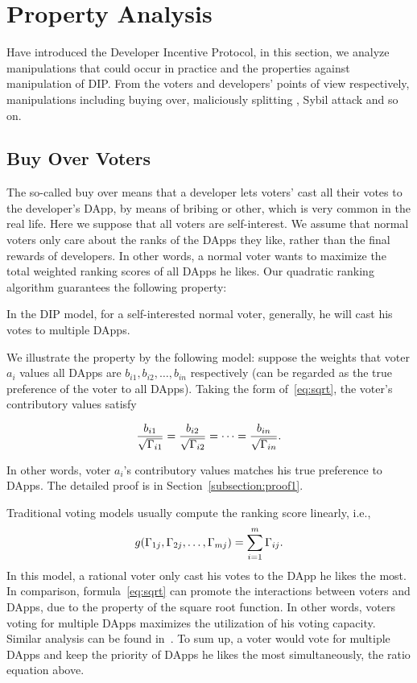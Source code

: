 \section{Property Analysis}
\label{section:properties}
\noindent Have introduced the Developer Incentive Protocol, in this section, we analyze
manipulations that could occur in practice and the properties against
manipulation of  DIP\@. From the voters and developers' points of view respectively, manipulations including buying over, maliciously splitting \dapp, Sybil attack and so on.
\subsection{Buy Over Voters}
\noindent The so-called buy over means that a developer lets voters' cast all their votes to the developer's DApp, by means of bribing or other, which is very common in the real life. Here we suppose that all voters are self-interest. We assume that normal voters only care about the ranks of the DApps they like, rather than the final rewards of developers. In other words, a normal voter wants to maximize the total
weighted ranking scores of all DApps he likes. Our quadratic ranking algorithm guarantees the following property:

\begin{property}
	\label{p1}
	In the DIP model, for a self-interested normal voter, generally, he will cast his votes to multiple DApps.
\end{property}
We illustrate the property by the following model: suppose the weights that
voter $a_i$ values all DApps are $b_{i1}, b_{i2}, \ldots, b_{in}$ respectively (can be regarded as the true preference of the voter to all DApps). Taking the form of~\ref{eq:sqrt}, the voter's contributory values satisfy

$$\frac{b_{i1}}{\sqrt{\Gamma_{i1}}}=\frac{b_{i2}}{\sqrt{\Gamma_{i2}}}=\cdots=\frac{b_{in}}{\sqrt{\Gamma_{in}}}.$$

In other words, voter $a_i$'s contributory values matches his true preference to DApps. The detailed proof is in Section~\ref{subsection:proof1}.

Traditional voting models usually compute the ranking score linearly, i.e.,
$$g(\Gamma_{1j},\Gamma_{2j},\ldots,\Gamma_{mj}) = \sum_{i=1}^m \Gamma_{ij}.$$
In this model, a rational voter only cast his votes to the DApp he likes the
most. In comparison, formula~\ref{eq:sqrt} can promote the interactions between
voters and DApps, due to the property of the square root function. In other
words, voters voting for multiple DApps maximizes the utilization of his voting
capacity. Similar analysis can be found in~\cite{buterin2018liberal}. To sum up,
a voter would vote for multiple DApps and keep the priority of DApps he likes
the most simultaneously, \ie the ratio equation above.

